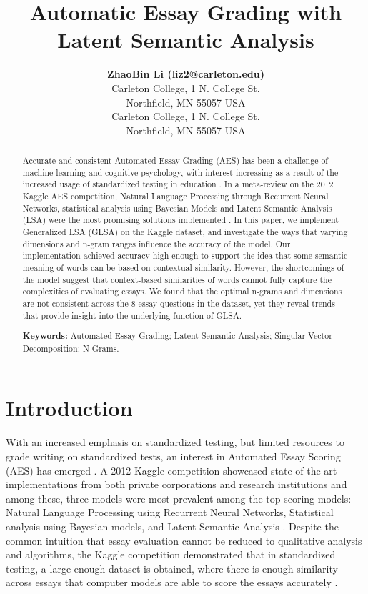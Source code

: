 \documentclass[10pt,letterpaper]{article}
\title{Automatic Essay Grading with Latent Semantic Analysis}
\author{{\large \bf ZhaoBin Li
(liz2@carleton.edu)} \\
 Carleton College, 1 N. College St.
 \\
 Northfield, MN 55057 USA
 \AND {\large \bf Owen Szafran
 (szafrano@carleton.edu)} \\
 Carleton College, 1 N. College St.
 \\
 Northfield, MN 55057 USA}
\begin{document}
\maketitle

\begin{abstract}
Accurate and consistent Automated Essay Grading (AES) has been a challenge of machine learning and cognitive psychology, with interest increasing as a result of the increased usage of standardized testing in education \cite{shermis2014state}. In a meta-review on the 2012 Kaggle AES competition, Natural Language Processing through Recurrent Neural Networks, statistical analysis using Bayesian Models and Latent Semantic Analysis (LSA) were the most promising solutions implemented \cite{shermis2014state}. In this paper, we implement Generalized LSA (GLSA) on the Kaggle dataset, and investigate the ways that varying dimensions and n-gram ranges influence the accuracy of the model. Our implementation achieved accuracy high enough to support the idea that some semantic meaning of words can be based on contextual similarity. However, the shortcomings of the model suggest that context-based similarities of words cannot fully capture the complexities of evaluating essays. We found that the optimal n-grams and dimensions are not consistent across the 8 essay questions in the dataset, yet they reveal trends that provide insight into the underlying function of GLSA. 

\textbf{Keywords:} 
Automated Essay Grading; Latent Semantic Analysis; Singular Vector Decomposition; N-Grams.
\end{abstract}

\section{Introduction}

With an increased emphasis on standardized testing, but limited resources to grade writing on standardized tests, an interest in Automated Essay Scoring (AES) has emerged \cite{shermis2014state}. A 2012 Kaggle competition showcased state-of-the-art implementations from both private corporations and research institutions and among these, three models were most prevalent among the top scoring models: Natural Language Processing using Recurrent Neural Networks, Statistical analysis using Bayesian models, and Latent Semantic Analysis \cite{shermis2014state}. Despite the common intuition that essay evaluation cannot be reduced to qualitative analysis and algorithms, the Kaggle competition demonstrated that in standardized testing, a large enough dataset is obtained, where there is enough similarity across essays that computer models are able to score the essays accurately \cite{shermis2014state}.
\end{document}

